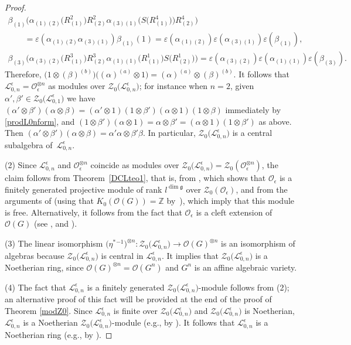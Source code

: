 \documentclass[pdftex]{sigma}
\numberwithin{equation}{section}
\theoremstyle{definition}
\newcommand{\e}{\epsilon}
\newcommand{\mz}{\mathbb{Z}}
\newcommand{\Ll}{{\mathcal L}}
\newcommand{\Oo}{{\mathcal O}}
\newcommand{\ra}{\rightarrow}
\begin{document}
\begin{proof}
\begin{gather*}
 \beta_{(1)}\big(\alpha_{(1)(2)}\big(R^2_{(1)}\big) R^2_{(2)} \alpha_{(3)(1)}\big(S\big(R^4_{(1)}\big)\big) R^4_{(2)}\big) \\
 \qquad = \varepsilon(\alpha_{(1)(2)}\alpha_{(3)(1)})\beta_{(1)}(1) = \varepsilon(\alpha_{(1)(2)})\varepsilon(\alpha_{(3)(1)})\varepsilon(\beta_{(1)}),\\
\beta_{(3)}\big(\alpha_{(3)(2)}\big(R^3_{(1)}\big)R^3_{(2)} \alpha_{(1)(1)}\big(R^1_{(1)}\big) S\big(R^1_{(2)}\big)\big) = \varepsilon(\alpha_{(3)(2)})\varepsilon(\alpha_{(1)(1)})\varepsilon(\beta_{(3)}).
\end{gather*}
Therefore, $\big(1\otimes (\beta)^{(b)}\big)\big((\alpha)^{(a)} \otimes 1\big) = (\alpha)^{(a)}\otimes (\beta)^{(b)}$. It follows that $\Ll_{0,n}^\e = \Oo_\e^{\otimes n}$ as modules over $\mathcal{Z}_0\bigl(\Ll_{0,n}^\e\bigr)$; for instance when $n=2$, given $\alpha',\beta'\in \mathcal{Z}_0\bigl(\Ll_{0,1}^\e\bigr)$ we have $(\alpha'\otimes \beta')(\alpha\otimes \beta) = (\alpha'\otimes 1)(1\otimes \beta')(\alpha\otimes 1)(1\otimes \beta)$ immediately by \eqref{prodL0nform}, and $(1\otimes \beta')(\alpha\otimes 1) = \alpha\otimes \beta' = (\alpha\otimes 1)(1\otimes \beta')$ as above. Then $(\alpha'\otimes \beta')(\alpha\otimes \beta) = \alpha'\alpha\otimes \beta'\beta$. In particular, $\mathcal{Z}_0\bigl(\Ll_{0,n}^\e\bigr)$ is a central subalgebra of~$\Ll_{0,n}^\e$.

(2) Since $\Ll_{0,n}^\e$ and $\Oo_\e^{\otimes n}$ coincide as modules over $\mathcal{Z}_0\big(\Ll_{0,n}^\e\big)=\mathcal{Z}_0(\Oo_\e^{\otimes n})$, the claim follows from Theorem~\ref{DCLteo1}, that is, from \cite[Theorem~7.2]{DC-L}, which shows that $\Oo_\e$ is a finitely generated projective module of rank $l^{\dim \mathfrak{g}}$ over $\mathcal{Z}_0(\Oo_\e)$, and from the arguments of \cite{BGS} (using that $K_0(\mathcal{O}(G))=\mz$ by~\cite{Marlin}), which imply that this module is free. Alternatively, it follows from the fact that $\Oo_\e$ is a cleft extension of $\Oo(G)$ (see \cite[Remark~2.18\,(b)]{AnGa}, and \cite[Section~3.2]{BC}).

(3) The linear isomorphism $\big(\eta^*{}^{-1}\big)^{\otimes n}\colon \mathcal{Z}_0\bigl(\Ll_{0,n}^\e\bigr)\ra\Oo(G)^{\otimes n}$ is an isomorphism of algebras because $\mathcal{Z}_0\bigl(\Ll_{0,n}^\e\bigr)$ is central in $\Ll_{0,n}^\e$. It implies that $\mathcal{Z}_0\bigl(\Ll_{0,n}^\e\bigr)$ is a Noetherian ring, since $\Oo(G)^{\otimes n} = \Oo(G^n)$ and $G^n$ is an affine algebraic variety.

(4) The fact that $\Ll_{0,n}^\e$ is a finitely generated $\mathcal{Z}_0\bigl(\Ll_{0,n}^\e\bigr)$-module follows from (2); an alternative proof of this fact will be provided at the end of the proof of Theorem \ref{modZ0}. Since $\Ll_{0,n}^\e$ is finite over $\mathcal{Z}_0\bigl(\Ll_{0,n}^\e\bigr)$ and $\mathcal{Z}_0\bigl(\Ll_{0,n}^\e\bigr)$ is Noetherian, $\Ll_{0,n}^\e$ is a Noetherian $\mathcal{Z}_0\bigl(\Ll_{0,n}^\e\bigr)$-module (e.g., by \cite[Proposition~6.5]{AM}). It follows that $\Ll_{0,n}^\e$ is a Noetherian ring (e.g., by \cite[Chapter~1, Section~1.3]{MC-R}).
\end{proof}
\end{document}
